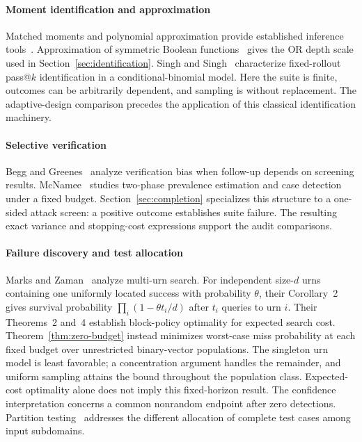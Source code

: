 \documentclass[conference]{IEEEtran}
\begin{document}
\paragraph{Moment identification and approximation}
Matched moments and polynomial approximation provide established inference tools~\cite{wu}. Approximation of symmetric Boolean functions~\cite{paturi} gives the OR depth scale used in Section~\ref{sec:identification}. Singh and Singh~\cite{singh} characterize fixed-rollout pass@$k$ identification in a conditional-binomial model. Here the suite is finite, outcomes can be arbitrarily dependent, and sampling is without replacement. The adaptive-design comparison precedes the application of this classical identification machinery.

\paragraph{Selective verification}
Begg and Greenes~\cite{begg} analyze verification bias when follow-up depends on screening results. McNamee~\cite{mcnamee} studies two-phase prevalence estimation and case detection under a fixed budget. Section~\ref{sec:completion} specializes this structure to a one-sided attack screen: a positive outcome establishes suite failure. The resulting exact variance and stopping-cost expressions support the audit comparisons.

\paragraph{Failure discovery and test allocation}
Marks and Zaman~\cite{marks} analyze multi-urn search. For independent size-$d$ urns containing one uniformly located success with probability $\theta$, their Corollary~2 gives survival probability $\prod_i(1-\theta t_i/d)$ after $t_i$ queries to urn $i$. Their Theorems~2 and~4 establish block-policy optimality for expected search cost. Theorem~\ref{thm:zero-budget} instead minimizes worst-case miss probability at each fixed budget over unrestricted binary-vector populations. The singleton urn model is least favorable; a concentration argument handles the remainder, and uniform sampling attains the bound throughout the population class. Expected-cost optimality alone does not imply this fixed-horizon result. The confidence interpretation concerns a common nonrandom endpoint after zero detections. Partition testing~\cite{chen} addresses the different allocation of complete test cases among input subdomains.
\end{document}
